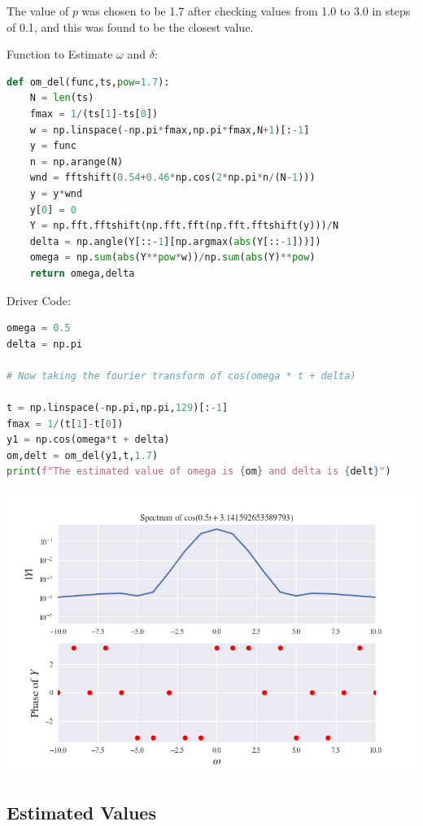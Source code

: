 \documentclass[12pt]{article}
\begin{document}
The value of $p$ was chosen to be 1.7 after checking values from 1.0 to 3.0 in steps of 0.1, and this was found to be the closest value.

Function to Estimate $\omega$ and $\delta$:
\begin{lstlisting}[language=Python]
def om_del(func,ts,pow=1.7):
    N = len(ts)
    fmax = 1/(ts[1]-ts[0])
    w = np.linspace(-np.pi*fmax,np.pi*fmax,N+1)[:-1]
    y = func
    n = np.arange(N)
    wnd = fftshift(0.54+0.46*np.cos(2*np.pi*n/(N-1)))
    y = y*wnd
    y[0] = 0
    Y = np.fft.fftshift(np.fft.fft(np.fft.fftshift(y)))/N
    delta = np.angle(Y[::-1][np.argmax(abs(Y[::-1]))])
    omega = np.sum(abs(Y**pow*w))/np.sum(abs(Y)**pow)
    return omega,delta
\end{lstlisting}

Driver Code:
\begin{lstlisting}[language=Python]
omega = 0.5
delta = np.pi

# Now taking the fourier transform of cos(omega * t + delta)

t = np.linspace(-np.pi,np.pi,129)[:-1]
fmax = 1/(t[1]-t[0])
y1 = np.cos(omega*t + delta)
om,delt = om_del(y1,t,1.7)
print(f"The estimated value of omega is {om} and delta is {delt}")
\end{lstlisting}

\begin{center}
    \includegraphics[scale=0.8]{images/fig11.png}
\end{center}

\subsection{Estimated Values}
\end{document}
